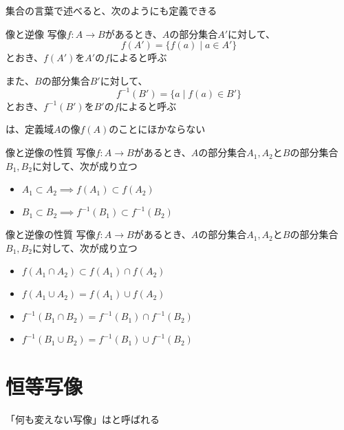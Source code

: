 \documentclass[../../../topic_mapping]{subfiles}
\begin{document}
集合の言葉で述べると、次のようにも定義できる

\begin{definition}{像と逆像}
  写像$f\colon A \to B$があるとき、$A$の部分集合$A'$に対して、
  \begin{equation*}
    f(A') = \{ f(a) \mid a \in A' \}
  \end{equation*}
  とおき、$f(A')$を$A'$の$f$によると呼ぶ

  また、$B$の部分集合$B'$に対して、
  \begin{equation*}
    f^{-1}(B') = \{ a \mid f(a) \in B' \}
  \end{equation*}
  とおき、$f^{-1}(B')$を$B'$の$f$によると呼ぶ
\end{definition}

は、定義域$A$の像$f(A)$のことにほかならない

\begin{theorem}{像と逆像の性質}
  写像$f\colon A \to B$があるとき、$A$の部分集合$A_1, A_2$と$B$の部分集合$B_1, B_2$に対して、次が成り立つ
  \begin{itemize}
    \item $A_1 \subset A_2 \implies f(A_1) \subset f(A_2)$
    \item $B_1 \subset B_2 \implies f^{-1}(B_1) \subset f^{-1}(B_2)$
  \end{itemize}
\end{theorem}

\begin{theorem}{像と逆像の性質}
  写像$f\colon A \to B$があるとき、$A$の部分集合$A_1, A_2$と$B$の部分集合$B_1, B_2$に対して、次が成り立つ
  \begin{itemize}
    \item $f(A_1 \cap A_2) \subset f(A_1) \cap f(A_2)$
    \item $f(A_1 \cup A_2) = f(A_1) \cup f(A_2)$
    \item $f^{-1}(B_1 \cap B_2) = f^{-1}(B_1) \cap f^{-1}(B_2)$
    \item $f^{-1}(B_1 \cup B_2) = f^{-1}(B_1) \cup f^{-1}(B_2)$
  \end{itemize}
\end{theorem}

\sectionline
\section{恒等写像}

「何も変えない写像」はと呼ばれる
\end{document}
